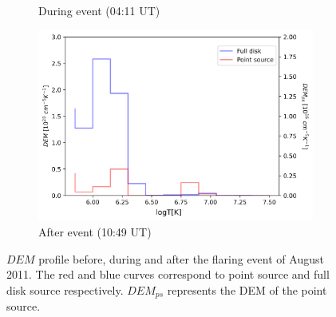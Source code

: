 \begin{figure}[h!]
\begin{subfigure}[b]{0.3\textwidth}
        \caption{During event (04:11 UT)}
        \label{fig:dem_pro_aug_04_2011_b}
    \end{subfigure}
    \hfill
    \begin{subfigure}[b]{0.3\textwidth}
        \centering
        \includegraphics[width=\textwidth]{images/dem_profile_after_event_2011_aug_04.png}
        \caption{After event (10:49 UT)}
    \end{subfigure}

    \caption[DEM profile for  August 2011 event]{$DEM$ profile before, during and after the flaring event of  August 2011. The red and blue curves correspond to point source and full disk source respectively. $DEM_{ps}$ represents the DEM of the point source.}
    \label{fig:dem_pro_aug_04_2011}
\end{figure}

